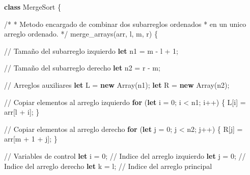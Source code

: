 \documentclass[
  spanish,
  letterpaper,
  DIV=11,
  numbers=noendperiod]{scrreprt}
\newenvironment{Shaded}{\begin{snugshade}}{\end{snugshade}}
\newcommand{\BuiltInTok}[1]{\textcolor[rgb]{0.00,0.23,0.31}{#1}}
\newcommand{\CommentTok}[1]{\textcolor[rgb]{0.37,0.37,0.37}{#1}}
\newcommand{\ControlFlowTok}[1]{\textcolor[rgb]{0.00,0.23,0.31}{\textbf{#1}}}
\newcommand{\DecValTok}[1]{\textcolor[rgb]{0.68,0.00,0.00}{#1}}
\newcommand{\FunctionTok}[1]{\textcolor[rgb]{0.28,0.35,0.67}{#1}}
\newcommand{\KeywordTok}[1]{\textcolor[rgb]{0.00,0.23,0.31}{\textbf{#1}}}
\newcommand{\NormalTok}[1]{\textcolor[rgb]{0.00,0.23,0.31}{#1}}
\newcommand{\OperatorTok}[1]{\textcolor[rgb]{0.37,0.37,0.37}{#1}}
\begin{document}
\begin{Shaded}
\begin{Highlighting}[]
\KeywordTok{class}\NormalTok{ MergeSort \{}

    \CommentTok{/*}
\CommentTok{     * Metodo encargado de combinar dos subarreglos ordenados}
\CommentTok{     * en un unico arreglo ordenado.}
\CommentTok{     */}
    \FunctionTok{merge\_arrays}\NormalTok{(arr}\OperatorTok{,}\NormalTok{ l}\OperatorTok{,}\NormalTok{ m}\OperatorTok{,}\NormalTok{ r) \{}

        \CommentTok{// Tamaño del subarreglo izquierdo}
        \KeywordTok{let}\NormalTok{ n1 }\OperatorTok{=}\NormalTok{ m }\OperatorTok{{-}}\NormalTok{ l }\OperatorTok{+} \DecValTok{1}\OperatorTok{;}

        \CommentTok{// Tamaño del subarreglo derecho}
        \KeywordTok{let}\NormalTok{ n2 }\OperatorTok{=}\NormalTok{ r }\OperatorTok{{-}}\NormalTok{ m}\OperatorTok{;}

        \CommentTok{// Arreglos auxiliares}
        \KeywordTok{let}\NormalTok{ L }\OperatorTok{=} \KeywordTok{new} \BuiltInTok{Array}\NormalTok{(n1)}\OperatorTok{;}
        \KeywordTok{let}\NormalTok{ R }\OperatorTok{=} \KeywordTok{new} \BuiltInTok{Array}\NormalTok{(n2)}\OperatorTok{;}

        \CommentTok{// Copiar elementos al arreglo izquierdo}
        \ControlFlowTok{for}\NormalTok{ (}\KeywordTok{let}\NormalTok{ i }\OperatorTok{=} \DecValTok{0}\OperatorTok{;}\NormalTok{ i }\OperatorTok{\textless{}}\NormalTok{ n1}\OperatorTok{;}\NormalTok{ i}\OperatorTok{++}\NormalTok{) \{}
\NormalTok{            L[i] }\OperatorTok{=}\NormalTok{ arr[l }\OperatorTok{+}\NormalTok{ i]}\OperatorTok{;}
\NormalTok{        \}}

        \CommentTok{// Copiar elementos al arreglo derecho}
        \ControlFlowTok{for}\NormalTok{ (}\KeywordTok{let}\NormalTok{ j }\OperatorTok{=} \DecValTok{0}\OperatorTok{;}\NormalTok{ j }\OperatorTok{\textless{}}\NormalTok{ n2}\OperatorTok{;}\NormalTok{ j}\OperatorTok{++}\NormalTok{) \{}
\NormalTok{            R[j] }\OperatorTok{=}\NormalTok{ arr[m }\OperatorTok{+} \DecValTok{1} \OperatorTok{+}\NormalTok{ j]}\OperatorTok{;}
\NormalTok{        \}}

        \CommentTok{// Variables de control}
        \KeywordTok{let}\NormalTok{ i }\OperatorTok{=} \DecValTok{0}\OperatorTok{;} \CommentTok{// Indice del arreglo izquierdo}
        \KeywordTok{let}\NormalTok{ j }\OperatorTok{=} \DecValTok{0}\OperatorTok{;} \CommentTok{// Indice del arreglo derecho}
        \KeywordTok{let}\NormalTok{ k }\OperatorTok{=}\NormalTok{ l}\OperatorTok{;} \CommentTok{// Indice del arreglo principal}


\end{Highlighting}
\end{Shaded}
\end{document}
